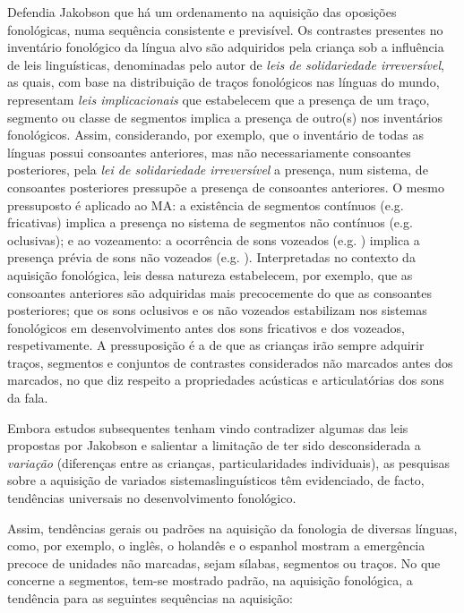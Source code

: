 \documentclass[output=paper]{LSP/langsci}
\begin{document}
Defendia Jakobson que há um ordenamento na aquisição das oposições fonológicas, numa sequência consistente e previsível. Os contrastes presentes no inventário fonológico da língua alvo são adquiridos pela criança sob a influência de leis linguísticas, denominadas pelo autor de \textit{leis de solidariedade irreversível}, as quais, com base na distribuição de traços fonológicos nas línguas do mundo, representam \textit{leis implicacionais} que estabelecem que a presença de um traço, segmento ou classe de segmentos implica a presença de outro(s) nos inventários fonológicos. Assim, considerando, por exemplo, que o inventário de todas as línguas possui consoantes anteriores, mas não necessariamente consoantes posteriores, pela \textit{lei de solidariedade irreversível} a presença, num sistema, de consoantes posteriores pressupõe a presença de consoantes anteriores. O mesmo pressuposto é aplicado ao MA: a existência de segmentos contínuos (e.g. fricativas) implica a presença no sistema de segmentos não contínuos (e.g. oclusivas); e ao vozeamento: a ocorrência de sons vozeados (e.g. ) implica a presença prévia de sons não vozeados (e.g. ). Interpretadas no contexto da aquisição fonológica, leis dessa natureza estabelecem, por exemplo, que as consoantes anteriores são adquiridas mais precocemente do que as consoantes posteriores; que os sons oclusivos e os não vozeados estabilizam nos sistemas fonológicos em desenvolvimento antes dos sons fricativos e dos vozeados, respetivamente. A pressuposição é a de que as crianças irão sempre adquirir traços, segmentos e conjuntos de contrastes considerados não marcados antes dos marcados, no que diz respeito a propriedades acústicas e articulatórias dos sons da fala.

Embora estudos subsequentes tenham vindo contradizer algumas das leis propostas por Jakobson e salientar a limitação de ter sido desconsiderada a \textit{variação} (diferenças entre as crianças, particularidades individuais), as pesquisas sobre a aquisição de variados sistemas\largerpage linguísticos têm evidenciado, de facto, tendências universais no desenvolvimento fonológico. 

Assim, tendências gerais ou padrões na aquisição da fonologia de diversas línguas, como, por exemplo, o inglês, o holandês e o espanhol mostram a emergência precoce de unidades não marcadas, sejam sílabas, segmentos ou traços. No que concerne a segmentos, tem-se mostrado padrão, na aquisição fonológica, a tendência para as seguintes sequências na aquisição:
\end{document}
